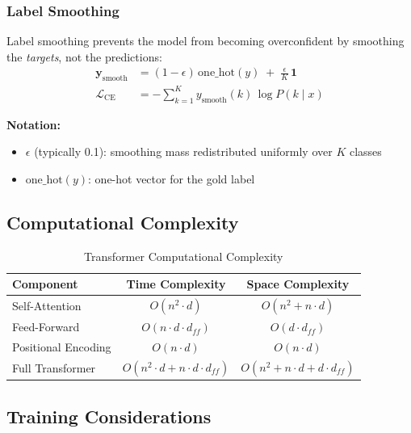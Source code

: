 \subsubsection{Label Smoothing}

Label smoothing prevents the model from becoming overconfident by smoothing the \emph{targets}, not the predictions:
\begin{align}
\mathbf{y}_{\text{smooth}} &= (1-\epsilon)\,\text{one\_hot}(y)
\; +\; \frac{\epsilon}{K}\,\mathbf{1} \\
\mathcal{L}_{\text{CE}} &= - \sum_{k=1}^{K} y_{\text{smooth}}(k)\, \log P(k\mid x)
\end{align}
\begin{notationbox}
\textbf{Notation:}
\begin{itemize}
    \item $\epsilon$ (typically 0.1): smoothing mass redistributed uniformly over $K$ classes
    \item $\text{one\_hot}(y)$: one-hot vector for the gold label
\end{itemize}
\end{notationbox}

\subsection{Computational Complexity}

\begin{table}[H]
\centering
\caption{Transformer Computational Complexity}
\begin{tabular}{l c c}
\toprule
\textbf{Component} & \textbf{Time Complexity} & \textbf{Space Complexity} \\
\midrule
Self-Attention & $O(n^2 \cdot d)$ & $O(n^2 + n \cdot d)$ \\
Feed-Forward & $O(n \cdot d \cdot d_{ff})$ & $O(d \cdot d_{ff})$ \\
Positional Encoding & $O(n \cdot d)$ & $O(n \cdot d)$ \\
Full Transformer & $O(n^2 \cdot d + n \cdot d \cdot d_{ff})$ & $O(n^2 + n \cdot d + d \cdot d_{ff})$ \\
\bottomrule
\end{tabular}
\end{table}

\subsection{Training Considerations}

